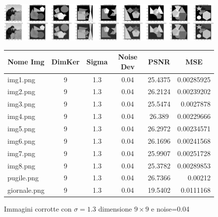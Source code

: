 \begin{figure}[H]
    \centering
    \begin{minipage}[h]{\textwidth}
    \includegraphics[width=\linewidth]{output/tabCorrotte/imgcorr12.png}\label{fig:imgcorrotte9x90.04}
    \end{minipage}
    \begin{minipage}[h]{\textwidth}
        \centering
        
        \begin{tabular}{|l c c c c r|}
            \hline
            \multicolumn{1}{|c}{\textbf{Nome Img}} & \multicolumn{1}{|c}{\textbf{DimKer}} & \multicolumn{1}{|c}{\textbf{Sigma}} & \multicolumn{1}{|c}{\textbf{Noise Dev}} & \multicolumn{1}{|c}{\textbf{PSNR}} & \multicolumn{1}{|c|}{\textbf{MSE}} \\ \hline
                img1.png & 9 & 1.3 & 0.04 & 25.4375 & 0.00285925 \\
                img2.png & 9 & 1.3 & 0.04 & 26.2124 & 0.00239202 \\
                img3.png & 9 & 1.3 & 0.04 & 25.5474 & 0.0027878 \\
                img4.png & 9 & 1.3 & 0.04 & 26.389 & 0.00229666 \\
                img5.png & 9 & 1.3 & 0.04 & 26.2972 & 0.00234571 \\
                img6.png & 9 & 1.3 & 0.04 & 26.1696 & 0.00241568 \\
                img7.png & 9 & 1.3 & 0.04 & 25.9907 & 0.00251728 \\
                img8.png & 9 & 1.3 & 0.04 & 25.3782 & 0.00289853 \\
                pugile.png & 9 & 1.3 & 0.04 & 26.7366 & 0.00212 \\
                giornale.png & 9 & 1.3 & 0.04 & 19.5402 & 0.0111168 \\ \hline
            \end{tabular}\label{tab:tabcorrotte9x90.04}
        
        \end{minipage}
    \captionsetup{labelformat=andtable}
    \caption{Immagini corrotte con $\sigma = 1.3$ dimensione $9 \times 9$ e noise=0.04}
\end{figure}


